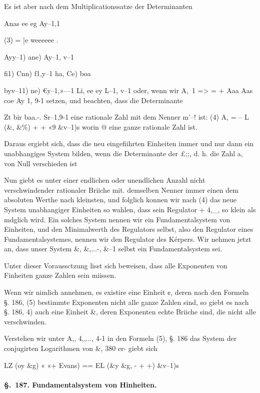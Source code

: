 \documentclass[12pt,a4paper]{article}
\theoremstyle{plain}
\theoremstyle{definition}
\begin{document}
Es ist aber nach dem Multiplicationssatze der Determinanten

Anas ee eg Ay--1,1

(3) = |e weeeeee .

Ayy--1) ane) Ay--1, v--1

fi1) Cnn) f1,y--1 ha, Ce) boa

byv--11) ne) €y--1,»---1 Li, ee ey L--1, v--1 oder, wenn wir A,~1 => = + Aaa Aas coe Ay 1, 9-1 setzen, und beachten, dass die Determinante

Zt bir baa.-. Sr--1,9-1 eine rationale Zahl mit dem Nenner m'--! ist: (4) A, = -- L (\&, \&\%) + + «9 \&v--1)s worin @ eine ganze rationale Zahl ist.

Daraus ergiebt sich, dass die neu eingefiihrten Einheiten immer und nur dann ein unabhangiges System bilden, wenn die Determinante der £;;, d. h. die Zahl a, von Null verschieden ist

Nun giebt es unter einer endlichen oder unendlichen Anzahl nicht verschwindender rationaler Briiche mit. demselben Nenner immer einen dem absoluten Werthe nach kleinsten, und folglich konnen wir nach (4) das neue System unabhangiger Einheiten so wahlen, dass sein Regulator + 4,\_, so klein als mdglich wird. Ein solches System nennen wir ein Fundamentalsystem von Einheiten, und den Minimalwerth des Regulators selbst, also den Regulator eines Fundamentalsystemes, nennen wir den Regulator des Kérpers. Wir nehmen jetzt an, dass unser System \&, \&,...-, \&--1 selbst ein Fundamentalsystem sei.

Unter dieser Voraussctzung lisst sich beweisen, dass alle Exponenten von Finheiten ganze Zahlen sein miissen.

Wenn wir nimlich annehmen, es existire eine Einheit ¢, deren nach den Formeln §. 186, (5) bestimmte Exponenten nicht alle ganze Zahlen sind, so giebt es nach §. 186, 4) auch eine Einheit \&, deren Exponenten echte Briiche sind, die nicht alle verschwinden.

Verstehen wir unter A,, 4,,..., 4-1 in den Formeln (5), §. 186 das System der conjugirten Logarithmen von \&, 380 er- giebt sich

LZ (oy \&g) « «+ Evans) == EL (\&y \&g, - + +) \&v--1)s

\paragraph{\S.~187. Fundamentalsystem von Hinheiten.}

\end{document}
